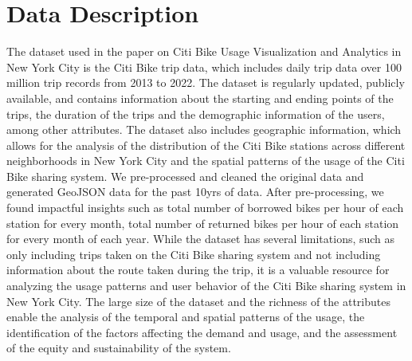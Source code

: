 \documentclass[journal]{vgtc}                     %
\begin{document}
\section{Data Description}
The dataset used in the paper on Citi Bike Usage Visualization and Analytics in New York City is the Citi Bike trip data, which includes daily trip data over 100 million trip records from 2013 to 2022. The dataset is regularly updated, publicly available, and contains information about the starting and ending points of the trips, the duration of the trips and the demographic information of the users, among other attributes. The dataset also includes geographic information, which allows for the analysis of the distribution of the Citi Bike stations across different neighborhoods in New York City and the spatial patterns of the usage of the Citi Bike sharing system. We pre-processed and cleaned the original data and generated GeoJSON data for the past 10yrs of data. After pre-processing, we found impactful insights such as total number of borrowed bikes per hour of each station for every month, total number of returned bikes per hour of each station for every month of each year. 
While the dataset has several limitations, such as only including trips taken on the Citi Bike sharing system and not including information about the route taken during the trip, it is a valuable resource for analyzing the usage patterns and user behavior of the Citi Bike sharing system in New York City. The large size of the dataset and the richness of the attributes enable the analysis of the temporal and spatial patterns of the usage, the identification of the factors affecting the demand and usage, and the assessment of the equity and sustainability of the system.
\end{document}

